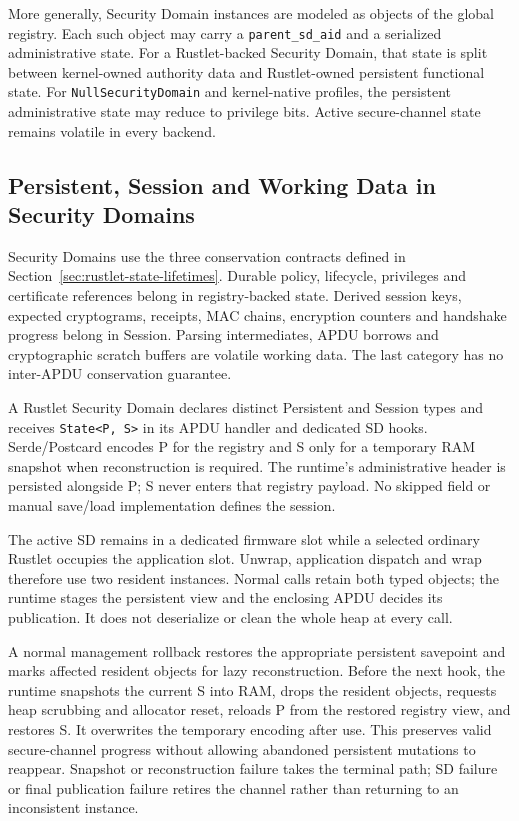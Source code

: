 More generally, Security Domain instances are modeled as objects of the global
registry. Each such object may carry a \texttt{parent\_sd\_aid} and a
serialized administrative state. For a Rustlet-backed Security Domain, that
state is split between kernel-owned authority data and Rustlet-owned persistent
functional state. For \texttt{NullSecurityDomain} and kernel-native profiles,
the persistent administrative state may reduce to privilege bits. Active
secure-channel state remains volatile in every backend.

\subsection{Persistent, Session and Working Data in Security Domains}
\label{sec:impl-scp-state-lifetime}

Security Domains use the three conservation contracts defined in
Section~\ref{sec:rustlet-state-lifetimes}. Durable policy, lifecycle,
privileges and certificate references belong in registry-backed state.
Derived session keys, expected cryptograms, receipts, MAC chains, encryption
counters and handshake progress belong in Session. Parsing intermediates,
APDU borrows and cryptographic scratch buffers are volatile working data.
The last category has no inter-APDU conservation guarantee.

A Rustlet Security Domain declares distinct Persistent and Session types and
receives \texttt{State<P, S>} in its APDU handler and dedicated SD hooks.
Serde/Postcard encodes P for the registry and S only for a temporary RAM
snapshot when reconstruction is required. The runtime's administrative
header is persisted alongside P; S never enters that registry payload.
No skipped field or manual save/load implementation defines the session.

The active SD remains in a dedicated firmware slot while a selected ordinary
Rustlet occupies the application slot. Unwrap, application dispatch and wrap
therefore use two resident instances. Normal calls retain both typed objects;
the runtime stages the persistent view and the enclosing APDU decides its
publication. It does not deserialize or clean the whole heap at every call.

A normal management rollback restores the appropriate persistent savepoint
and marks affected resident objects for lazy reconstruction. Before the next
hook, the runtime snapshots the current S into RAM, drops the resident
objects, requests heap scrubbing and allocator reset, reloads P from the
restored registry view, and restores S. It overwrites the temporary encoding
after use. This preserves valid secure-channel progress without allowing
abandoned persistent mutations to reappear. Snapshot or reconstruction
failure takes the terminal path; SD failure or final publication failure
retires the channel rather than returning to an inconsistent instance.

